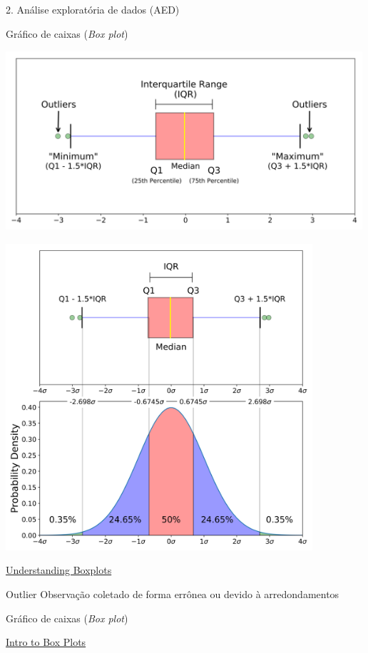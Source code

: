 \documentclass[
  ignorenonframetext,
]{beamer}
\begin{document}
\begin{frame}[fragile]{2. Análise exploratória de dados (AED)}
\begin{block}{Gráfico de caixas (\emph{Box plot})}
\includegraphics[width=5.20833in,height=2.91667in]{img/plot_boxplot1.png}
\includegraphics[width=4.47917in,height=4.47917in]{img/plot_boxplot2.png}

\href{https://www.kdnuggets.com/2019/11/understanding-boxplots.html}{Understanding
Boxplots}
\end{block}

\begin{block}{Outlier}
\protect\hypertarget{outlier}{}
Observação coletado de forma errônea ou devido à arredondamentos
\end{block}

\begin{block}{Gráfico de caixas (\emph{Box plot})}
\protect\hypertarget{gruxe1fico-de-caixas-box-plot-2}{}
\pause

\href{https://plotly.com/chart-studio-help/what-is-a-box-plot/}{Intro to
Box Plots}
\end{block}


\end{frame}
\end{document}
